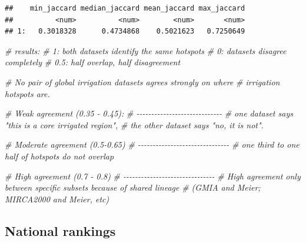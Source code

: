 \documentclass[
  11pt,
]{article}
\newenvironment{Shaded}{\begin{snugshade}}{\end{snugshade}}
\newcommand{\CommentTok}[1]{\textcolor[rgb]{0.56,0.35,0.01}{\textit{#1}}}
\begin{document}
\begin{verbatim}
##    min_jaccard median_jaccard mean_jaccard max_jaccard
##          <num>          <num>        <num>       <num>
## 1:   0.3018328      0.4734868    0.5021623   0.7250649
\end{verbatim}

\begin{Shaded}
\begin{Highlighting}[]
\CommentTok{\# results:}
\CommentTok{\# 1: both datasets identify the same hotspots}
\CommentTok{\# 0: datasets disagree completely}
\CommentTok{\# 0.5: half overlap, half disagreement}

\CommentTok{\# No pair of global irrigation datasets agrees strongly on where}
\CommentTok{\# irrigation hotspots are.}

\CommentTok{\# Weak agreement (0.35 {-} 0.45):}
\CommentTok{\# {-}{-}{-}{-}{-}{-}{-}{-}{-}{-}{-}{-}{-}{-}{-}{-}{-}{-}{-}{-}{-}{-}{-}{-}{-}{-}{-}{-}{-}}
\CommentTok{\# one dataset says "this is a core irrigated region",}
\CommentTok{\# the other dataset says "no, it is not".}

\CommentTok{\# Moderate agreement (0.5{-}0.65)}
\CommentTok{\# {-}{-}{-}{-}{-}{-}{-}{-}{-}{-}{-}{-}{-}{-}{-}{-}{-}{-}{-}{-}{-}{-}{-}{-}{-}{-}{-}{-}{-}{-}{-}}
\CommentTok{\# one third to one half of hotspots do not overlap}

\CommentTok{\# High agreement (0.7 {-} 0.8)}
\CommentTok{\# {-}{-}{-}{-}{-}{-}{-}{-}{-}{-}{-}{-}{-}{-}{-}{-}{-}{-}{-}{-}{-}{-}{-}{-}{-}{-}{-}{-}{-}{-}{-}}
\CommentTok{\# High agreement only between specific subsets because of shared lineage }
\CommentTok{\# (GMIA and Meier; MIRCA2000 and Meier, etc)}
\end{Highlighting}
\end{Shaded}

\subsection{National rankings}\label{national-rankings}
\end{document}
